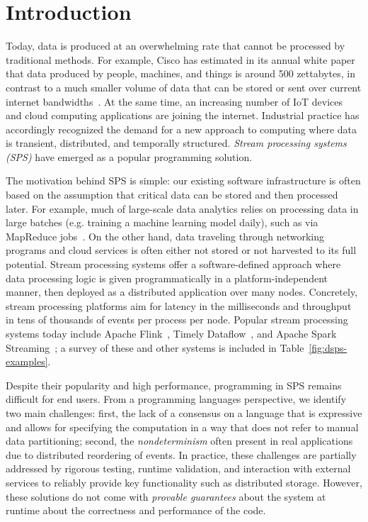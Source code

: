 \section{Introduction}

Today, data is produced at an overwhelming rate
that cannot be processed by traditional methods.
For example, Cisco has estimated in its annual white paper
that data produced by people, machines, and things
is around 500 zettabytes, in contrast to a much smaller volume
of data that can be stored or sent over current internet bandwidths~\cite{index2018forecast}.
At the same time, an increasing number of IoT devices~\cite{shi2016edge, ashton2009internet} and cloud computing applications
are joining the internet.
Industrial practice has accordingly recognized the demand
for a new approach to computing
where data is transient, distributed, and temporally structured.
\emph{Stream processing systems (SPS)} have emerged as a popular
programming solution.

The motivation behind SPS is simple:
our existing software infrastructure is often based on the assumption that
critical data can be stored and then processed later.
For example,
much of large-scale data analytics relies on processing data in large
batches (e.g. training a machine learning model daily),
such as via MapReduce jobs~\cite{dean2008mapreduce}.
On the other hand, data traveling through networking programs
and cloud services is often either not stored or not harvested to its full potential.
Stream processing systems offer a software-defined approach where
data processing logic is given programmatically in a platform-independent manner, then
deployed as a distributed application over many nodes.
Concretely, stream processing platforms aim for latency in the milliseconds and throughput in tens of thousands of events per process per node.
Popular stream processing systems today include
Apache Flink~\cite{Flink,Flink2015},
Timely Dataflow~\cite{Timely,Naiad2013},
and Apache Spark Streaming~\cite{SparkStreaming,Spark2013};
a survey of these and other systems is included in Table~\ref{fig:dsps-examples}.

Despite their popularity and high performance,
programming in SPS remains difficult for end users.
From a programming languages perspective,
we identify two main challenges:
first, the lack of a consensus on a language that is expressive and allows for specifying the computation in a way that does not refer to manual data partitioning;
second, the \emph{nondeterminism} often present in real applications
due to distributed reordering of events.
In practice, these challenges are partially addressed by rigorous testing,
runtime validation, and interaction with external services to reliably provide key functionality such as distributed storage.
However, these solutions do not come with \emph{provable guarantees}
about the system at runtime about the correctness and performance of the code.

